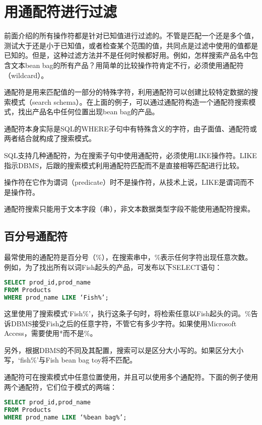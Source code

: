 \section{用通配符进行过滤}

前面介绍的所有操作符都是针对已知值进行过滤的。不管是匹配一个还是多个值，测试大于还是小于已知值，或者检查某个范围的值，共同点是过滤中使用的值都是已知的。但是，这种过滤方法并不是任何时候都好用。例如，怎样搜索产品名中包含文本bean bag的所有产品？用简单的比较操作符肯定不行，必须使用通配符（wildcard）。

通配符是用来匹配值的一部分的特殊字符，利用通配符可以创建比较特定数据的搜索模式（search schema）。在上面的例子，可以通过通配符构造一个通配符搜索模式，找出产品名中任何位置出现bean bag的产品。

通配符本身实际是SQL的WHERE子句中有特殊含义的字符，由子面值、通配符或两者结合就构成了搜索模式。

SQL支持几种通配符，为在搜索子句中使用通配符，必须使用LIKE操作符。LIKE指示DBMS，后跟的搜索模式利用通配符匹配而不是直接相等匹配进行比较。

操作符在它作为谓词（predicate）时不是操作符，从技术上说，LIKE是谓词而不是操作符。

通配符搜索只能用于文本字段（串），非文本数据类型字段不能使用通配符搜索。
\subsection{百分号通配符}

最常使用的通配符是百分号（\%），在搜索串中，\%表示任何字符出现任意次数。例如，为了找出所有以词Fish起头的产品，可发布以下SELECT语句：

\begin{lstlisting}[language=SQL]
SELECT prod_id,prod_name
FROM Products
WHERE prod_name LIKE ‘Fish%’;
\end{lstlisting}

这里使用了搜索模式‘Fish\%’，执行这条子句时，将检索任意以Fish起头的词。\%告诉DBMS接受Fish之后的任意字符，不管它有多少字符。如果使用Microsoft Access，需要使用*而不是\%。

另外，根据DBMS的不同及其配置，搜索可以是区分大小写的。如果区分大小写，‘fish\%’与Fish bean bag toy将不匹配。

通配符可在搜索模式中任意位置使用，并且可以使用多个通配符。下面的例子使用两个通配符，它们位于模式的两端：

\begin{lstlisting}[language=SQL]
SELECT prod_id,prod_name
FROM Products
WHERE prod_name LIKE ‘%bean bag%’;
\end{lstlisting}

